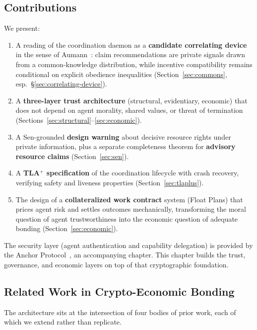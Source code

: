 \documentclass[11pt,a4paper]{article}
\theoremstyle{definition}
\theoremstyle{remark}
\begin{document}
\subsection{Contributions}
We present:
\begin{enumerate}
  \item A reading of the coordination daemon as a \textbf{candidate correlating device} in the sense of Aumann~: claim recommendations are private signals drawn from a common-knowledge distribution, while incentive compatibility remains conditional on explicit obedience inequalities (Section~\ref{sec:commons}, esp.\ \S\ref{sec:correlating-device}).
  \item A \textbf{three-layer trust architecture} (structural, evidentiary, economic) that does not depend on agent morality, shared values, or threat of termination (Sections~\ref{sec:structural}--\ref{sec:economic}).
  \item A Sen-grounded \textbf{design warning} about decisive resource rights under private information, plus a separate completeness theorem for \textbf{advisory resource claims} (Section~\ref{sec:sen}).
  \item A \textbf{TLA$^{+}$ specification} of the coordination lifecycle with crash recovery, verifying safety and liveness properties (Section~\ref{sec:tlaplus}).
  \item The design of a \textbf{collateralized work contract} system (Float Plans) that prices agent risk and settles outcomes mechanically, transforming the moral question of agent trustworthiness into the economic question of adequate bonding (Section~\ref{sec:economic}).
\end{enumerate}
The security layer (agent authentication and capability delegation) is provided by the Anchor Protocol~, an accompanying chapter. This chapter builds the trust, governance, and economic layers on top of that cryptographic foundation.
\subsection{Related Work in Crypto-Economic Bonding}\label{sec:related-bonding}
The architecture sits at the intersection of four bodies of prior work, each of which we extend rather than replicate.
\end{document}
